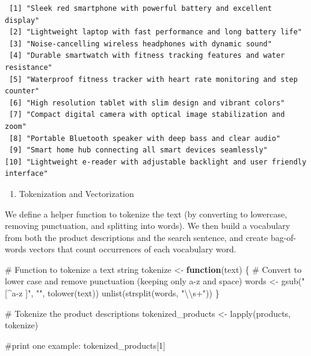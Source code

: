 \documentclass[
  letterpaper,
  DIV=11,
  numbers=noendperiod]{scrartcl}
\newenvironment{Shaded}{\begin{snugshade}}{\end{snugshade}}
\newcommand{\CommentTok}[1]{\textcolor[rgb]{0.37,0.37,0.37}{#1}}
\newcommand{\ControlFlowTok}[1]{\textcolor[rgb]{0.00,0.23,0.31}{\textbf{#1}}}
\newcommand{\DecValTok}[1]{\textcolor[rgb]{0.68,0.00,0.00}{#1}}
\newcommand{\FunctionTok}[1]{\textcolor[rgb]{0.28,0.35,0.67}{#1}}
\newcommand{\NormalTok}[1]{\textcolor[rgb]{0.00,0.23,0.31}{#1}}
\newcommand{\OtherTok}[1]{\textcolor[rgb]{0.00,0.23,0.31}{#1}}
\newcommand{\SpecialCharTok}[1]{\textcolor[rgb]{0.37,0.37,0.37}{#1}}
\newcommand{\StringTok}[1]{\textcolor[rgb]{0.13,0.47,0.30}{#1}}
\providecommand{\tightlist}{%
  \setlength{\itemsep}{0pt}\setlength{\parskip}{0pt}}
\begin{document}
\begin{verbatim}
 [1] "Sleek red smartphone with powerful battery and excellent display"          
 [2] "Lightweight laptop with fast performance and long battery life"            
 [3] "Noise-cancelling wireless headphones with dynamic sound"                   
 [4] "Durable smartwatch with fitness tracking features and water resistance"    
 [5] "Waterproof fitness tracker with heart rate monitoring and step counter"    
 [6] "High resolution tablet with slim design and vibrant colors"                
 [7] "Compact digital camera with optical image stabilization and zoom"          
 [8] "Portable Bluetooth speaker with deep bass and clear audio"                 
 [9] "Smart home hub connecting all smart devices seamlessly"                    
[10] "Lightweight e-reader with adjustable backlight and user friendly interface"
\end{verbatim}

\begin{enumerate}
\def\labelenumi{\arabic{enumi}.}
\tightlist
\item
  Tokenization and Vectorization
\end{enumerate}

We define a helper function to tokenize the text (by converting to
lowercase, removing punctuation, and splitting into words). We then
build a vocabulary from both the product descriptions and the search
sentence, and create bag-of-words vectors that count occurrences of each
vocabulary word.

\begin{Shaded}
\begin{Highlighting}[]
\CommentTok{\# Function to tokenize a text string}
\NormalTok{tokenize }\OtherTok{\textless{}{-}} \ControlFlowTok{function}\NormalTok{(text) \{}
  \CommentTok{\# Convert to lower case and remove punctuation (keeping only a{-}z and space)}
\NormalTok{  words }\OtherTok{\textless{}{-}} \FunctionTok{gsub}\NormalTok{(}\StringTok{"[\^{}a{-}z ]"}\NormalTok{, }\StringTok{""}\NormalTok{, }\FunctionTok{tolower}\NormalTok{(text))}
  \FunctionTok{unlist}\NormalTok{(}\FunctionTok{strsplit}\NormalTok{(words, }\StringTok{"}\SpecialCharTok{\textbackslash{}\textbackslash{}}\StringTok{s+"}\NormalTok{))}
\NormalTok{\}}

\CommentTok{\# Tokenize the product descriptions}
\NormalTok{tokenized\_products }\OtherTok{\textless{}{-}} \FunctionTok{lapply}\NormalTok{(products, tokenize)}

\CommentTok{\#print one example:}
\NormalTok{tokenized\_products[}\DecValTok{1}\NormalTok{]}
\end{Highlighting}
\end{Shaded}
\end{document}
